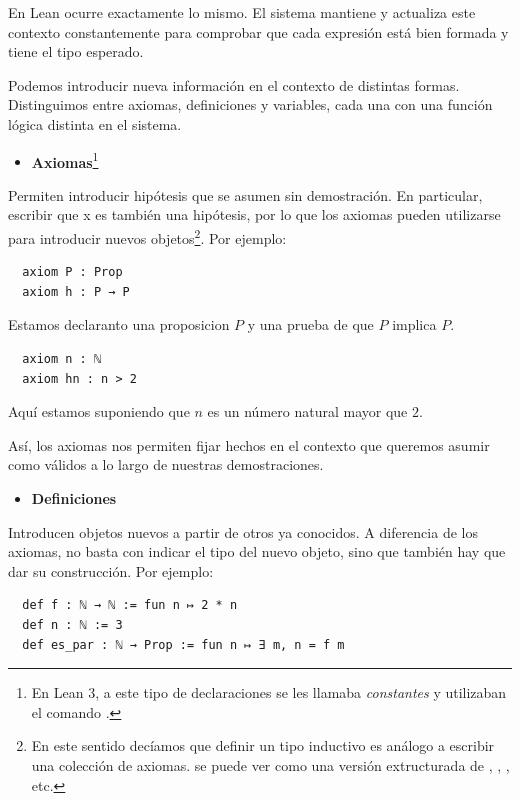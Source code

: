 En Lean ocurre exactamente lo mismo. El sistema mantiene y actualiza este contexto constantemente para comprobar que cada expresión está bien formada y tiene el tipo esperado.

Podemos introducir nueva información en el contexto de distintas formas. Distinguimos entre axiomas, definiciones y variables, cada una con una función lógica distinta en el sistema.

\begin{itemize}
  \item \textbf{Axiomas}\footnote{En Lean 3, a este tipo de declaraciones se les llamaba \textit{constantes} y utilizaban el comando .}
\end{itemize}

Permiten introducir hipótesis que se asumen sin demostración. En particular, escribir que x  es también una hipótesis, por lo que los axiomas pueden utilizarse para introducir nuevos objetos\footnote{En este sentido decíamos que definir un tipo inductivo es análogo a escribir una colección de axiomas.  se puede ver como una versión extructurada de , , , etc.}. Por ejemplo:

\begin{lstlisting}
  axiom P : Prop
  axiom h : P → P
\end{lstlisting}

Estamos declaranto una proposicion $P$ y una prueba de que $P$ implica $P$.

\begin{lstlisting}
  axiom n : ℕ
  axiom hn : n > 2
\end{lstlisting}

Aquí estamos suponiendo que $n$ es un número natural mayor que $2$.

Así, los axiomas nos permiten fijar hechos en el contexto que queremos asumir como válidos a lo largo de nuestras demostraciones.


\begin{itemize}
  \item \textbf{Definiciones}
\end{itemize}

Introducen objetos nuevos a partir de otros ya conocidos. A diferencia de los axiomas, no  basta con indicar el tipo del nuevo objeto, sino que también hay que dar su construcción. Por ejemplo:

\begin{lstlisting}
  def f : ℕ → ℕ := fun n ↦ 2 * n
  def n : ℕ := 3
  def es_par : ℕ → Prop := fun n ↦ ∃ m, n = f m
\end{lstlisting}


